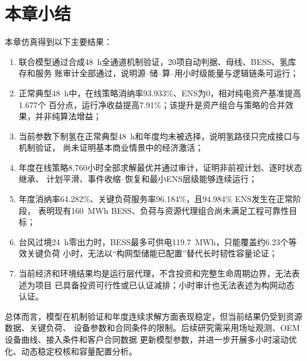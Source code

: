 \section{本章小结}

本章仿真得到以下主要结果：
\begin{enumerate}[label=(\arabic*)]
\item 联合模型通过合成48~h全通道机制验证，20项自动判据、母线、BESS、氢库存和服务
      账审计全部通过，说明源--储--算--用小时级能量与逻辑链条可运行；
\item 正常典型48~h中，在线策略消纳率93.933\%、ENS为0，相对纯电资产基准提高1.677个
      百分点，运行净收益提高7.91\%；该提升是资产组合与策略的合并效果，并非纯算法增益；
\item 当前参数下制氢在正常典型48~h和年度均未被选择，说明氢路径只完成接口与机制验证，
      尚未证明基本商业情景中的经济激活；
\item 年度在线策略8,760小时全部求解最优并通过审计，证明非前视计划、逐时状态继承、
      计划平滑、事件收缩--恢复和最小ENS层级能够连续运行；
\item 年度消纳率64.282\%、关键负荷服务率96.184\%，且94.984\% ENS发生在正常阶段，
      表明现有160~MWh BESS、负荷与资源代理组合尚未满足工程可靠性目标；
\item 台风过境24~h零出力时，BESS最多可供电119.7~MWh，只能覆盖约6.23个等效关键负荷
      小时，无法以“构网型储能已配置”替代长时韧性容量论证；
\item 当前经济和环境结果均是运行层代理，不含投资和完整生命周期边界，无法表述为项目
      已具备投资可行性或已认证减排；小时审计也无法表述为构网动态认证。
\end{enumerate}

总体而言，模型在机制验证和年度连续求解方面表现稳定，但当前结果仍受到资源数据、关键负荷、
设备参数和合同条件的限制。后续研究需采用场址观测、OEM设备曲线、接入条件和客户合同数据
更新模型参数，并进一步开展多小时滚动优化、动态稳定校核和容量配置分析。
